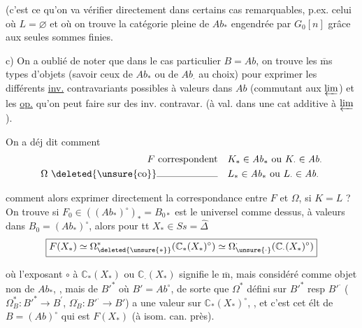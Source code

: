 
(c'est ce qu'on va vérifier directement dans
certains cas remarquables, p.ex. celui où
$L=\varnothing$ et où on trouve la  catégorie pleine
de $\mathit{Ab}_{\ast}$ engendrée par  $G_0[n]$ grâce aux
seules sommes finies.

c) On a oublié de noter que 
dans le cas particulier $B=\mathit{Ab}$,
on trouve les $\overline{\mathrm m}$s types d'objets
(savoir ceux de $\mathit{Ab}_{\ast}$ ou de $\mathit{Ab}_{\cdot}$ au
choix) pour exprimer les différents
\uline{inv.} contravariants  possibles à valeurs
dans $\mathit{Ab}$ (commutant aux $\varprojlim$) et
les \uline{op.} \inserted{$\Omega$} qu'on peut faire sur des
inv. contravar.   (à val.
dans une cat  additive à $\varprojlim$).

On a déj dit comment
\[
\begin{aligned}
F\ \text{correspondent}&\quad K_{\ast}\in\mathit{Ab}_{\ast}\ \text{ou}\ K_{\cdot}\in\mathit{Ab}_{\cdot}\\
\Omega\ \deleted{\text{\unsure{co}}}\text{\rule{2.2cm}{0.3pt}}&\quad
L_{\ast}\in\mathit{Ab}_{\ast}\ \text{ou}\ L_{\cdot}\in\mathit{Ab}_{\cdot}
\end{aligned}
\]

comment alors exprimer directement la correspondance entre
$F$ et $\Omega$, si $K=L$ ? On trouve
si $F_0\in((\mathit{Ab}_{\ast})^{\circ})_{\ast}=B_{0\ast}$
 est le  
universel comme dessus, à valeurs dans
$B_0=(\mathit{Ab}_{\ast})^{\circ}$, alors pour tt $X_{\ast}\in\mathit{Ss}=\widehat\Delta$
\[
\boxed{F(X_{\ast})\simeq\Omega_{\deleted{\unsure{\ast}}}^{\ast}(\mathbb C_{\ast}(X_{\ast})^{\circ})\simeq
\Omega_{\unsure{\cdot}}^{\cdot}(\mathbb C_{\cdot}(X_{\ast})^{\circ})}
\]

où l'exposant $\circ$ à $\mathbb C_{\ast}(X_{\ast})$ ou $\mathbb C_{\cdot}(X_{\ast})$
signifie le $\overline{\mathrm m}$, mais considéré comme
objet non de $\mathit{Ab}_{\ast}$, , mais de 
$B'^{\ast}$  où $B'=\mathit{Ab}^{\circ}$, de sorte que $\Omega^{\ast}$
 défini sur 
$B'^{\ast}$ resp $B'^{\cdot}$ ($\Omega_{B}^{\ast}:B'^{\ast}\longrightarrow B^{\prime}$,
$\Omega^{\cdot}_{B}:B'^{\cdot}\longrightarrow B'$)
a une valeur sur $\mathbb C_{\ast}(X_{\ast})^{\circ}$, , et
c'est cet élt de $B=(\mathit{Ab})^{\circ}$ qui est
$F(X_{\ast})$ (à isom. can. près).

